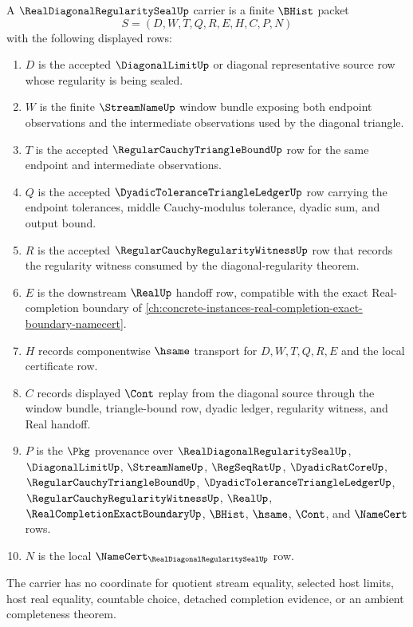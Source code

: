 \begin{definition}
\label{def:real-diagonal-regularity-seal-carrier}
A $\RealDiagonalRegularitySealUp$ carrier is a finite $\BHist$ packet
$$
S=(D,W,T,Q,R,E,H,C,P,N)
$$
with the following displayed rows:
\begin{enumerate}
\item $D$ is the accepted $\DiagonalLimitUp$ or diagonal representative source row whose regularity is being sealed.
\item $W$ is the finite $\StreamNameUp$ window bundle exposing both endpoint observations and the intermediate observations used by the diagonal triangle.
\item $T$ is the accepted $\RegularCauchyTriangleBoundUp$ row for the same endpoint and intermediate observations.
\item $Q$ is the accepted $\DyadicToleranceTriangleLedgerUp$ row carrying the endpoint tolerances, middle Cauchy-modulus tolerance, dyadic sum, and output bound.
\item $R$ is the accepted $\RegularCauchyRegularityWitnessUp$ row that records the regularity witness consumed by the diagonal-regularity theorem.
\item $E$ is the downstream $\RealUp$ handoff row, compatible with the exact Real-completion boundary of \autoref{ch:concrete-instances-real-completion-exact-boundary-namecert}.
\item $H$ records componentwise $\hsame$ transport for $D,W,T,Q,R,E$ and the local certificate row.
\item $C$ records displayed $\Cont$ replay from the diagonal source through the window bundle, triangle-bound row, dyadic ledger, regularity witness, and Real handoff.
\item $P$ is the $\Pkg$ provenance over $\RealDiagonalRegularitySealUp$, $\DiagonalLimitUp$, $\StreamNameUp$, $\RegSeqRatUp$, $\DyadicRatCoreUp$, $\RegularCauchyTriangleBoundUp$, $\DyadicToleranceTriangleLedgerUp$, $\RegularCauchyRegularityWitnessUp$, $\RealUp$, $\RealCompletionExactBoundaryUp$, $\BHist$, $\hsame$, $\Cont$, and $\NameCert$ rows.
\item $N$ is the local $\NameCert_{\RealDiagonalRegularitySealUp}$ row.
\end{enumerate}
The carrier has no coordinate for quotient stream equality, selected host limits, host real equality, countable choice, detached completion evidence, or an ambient completeness theorem.
\end{definition}

